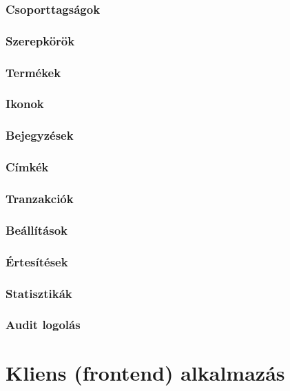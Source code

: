 \subsubsection{Csoporttagságok}

\subsubsection{Szerepkörök}

\subsubsection{Termékek}

\subsubsection{Ikonok}

\subsubsection{Bejegyzések}

\subsubsection{Címkék}

\subsubsection{Tranzakciók}

\subsubsection{Beállítások}

\subsubsection{Értesítések}

\subsubsection{Statisztikák}

\subsubsection{Audit logolás}

\section{Kliens (frontend) alkalmazás}

